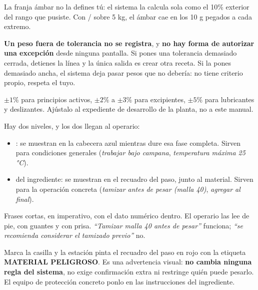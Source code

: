 La franja ámbar no la defines tú: el sistema la calcula sola como el 10\% exterior del
rango que pusiste. Con / sobre 5 kg, el ámbar cae en los 10 g pegados a
cada extremo.

\begin{cajaOjo}
\textbf{Un peso fuera de tolerancia no se registra}, y \textbf{no hay forma de
autorizar una excepción} desde ninguna pantalla. Si pones una tolerancia demasiado
cerrada, detienes la línea y la única salida es crear otra receta. Si la pones
demasiado ancha, el sistema deja pasar pesos que no debería: no tiene criterio propio,
respeta el tuyo.
\end{cajaOjo}


$\pm 1\%$ para principios activos, $\pm 2\%$ a $\pm 3\%$ para excipientes, $\pm 5\%$
para lubricantes y deslizantes. Ajústalo al expediente de desarrollo de la planta, no
a este manual.

\newpage
{}


Hay dos niveles, y los dos llegan al operario:

\begin{itemize}
    \item {}: se muestran en la cabecera azul mientras dure
          esa fase completa. Sirven para condiciones generales (\textit{trabajar bajo
          campana}, \textit{temperatura máxima 25 °C}).
    \item {} del ingrediente: se muestran en el recuadro del paso, junto
          al material. Sirven para la operación concreta (\textit{tamizar antes de pesar
          (malla 40)}, \textit{agregar al final}).
\end{itemize}

\begin{cajaTip}
Frases cortas, en imperativo, con el dato numérico dentro. El operario las lee de pie,
con guantes y con prisa. \textit{``Tamizar malla 40 antes de pesar''} funciona;
\textit{``se recomienda considerar el tamizado previo''} no.
\end{cajaTip}


Marca la casilla y la estación pinta el recuadro del paso en rojo con la etiqueta
\textbf{MATERIAL PELIGROSO}. Es una advertencia visual: \textbf{no cambia ninguna regla
del sistema}, no exige confirmación extra ni restringe quién puede pesarlo. El equipo
de protección concreto ponlo en las instrucciones del ingrediente.

